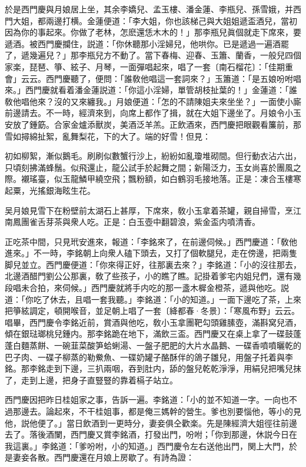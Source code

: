 於是西門慶與月娘居上坐，其余李嬌兒、孟玉樓、潘金蓮、李瓶兒、孫雪娥，并西門大姐，都兩邊打横。金蓮便道：「李大姐，你也該梯己與大姐姐遞盃酒兒，當初因為你的事起來。你做了老林，怎麽還恁木木的！」那李瓶兒眞個就走下席來，要遞酒。被西門慶攔住，説道：「你休聽那小淫婦兒，他哄你。已是遞過一遍酒罷了，遞幾遍兒？」那李瓶兒方不動了。當下春梅、迎春、玉簫、蘭香，一般兒四個家楽，琵琶、箏、絃子、月琴，一面彈唱起來，唱了一套〔南石榴花〕：「佳期重會」云云。西門慶聽了，便問：「誰敎他唱這一套詞來？」玉簫道：「是五娘吩咐唱來。」西門慶就看着潘金蓮説道：「你這小淫婦，單管胡枝扯葉的！」金蓮道：「誰敎他唱他來？沒的又來纏我。」月娘便道：「怎的不請陳姐夫來坐坐？」一面使小廝前邊請去。不一時，經濟來到，向席上都作了揖，就在大姐下邊坐了。月娘令小玉安放了鍾筯。合家金爐添獸炭，美酒泛羊羔。正飲酒來，西門慶把眼觀看簾前，那雪如撏綿扯絮，亂舞梨花，下的大了。端的好雪！但見：

\begin{myquote}
初如柳絮，漸似鵝毛。刷刷似數蟹行沙上，紛紛如亂瓊堆砌間。但行動衣沾六出，只頃刻拂滿蜂鬚。似飛還止，龍公試手於起舞之間；新陽泛力，玉女尚喜於團風之際。襯瑤臺，似玉龍鱗甲繞空飛；飄粉額，如白鶴羽毛接地落。正是：凍合玉樓寒起粟，光搖銀海眩生花。
\end{myquote}

吴月娘見雪下在粉壁前太湖石上甚厚，下席來，敎小玉拿着茶罐，親自掃雪，烹江南鳳團雀舌芽茶與衆人吃。正是：白玉壺中翻碧浪，紫金盃内噴清香。

正吃茶中間，只見玳安進來，報道：「李銘來了，在前邊伺候。」西門慶道：「敎他進來。」不一時，李銘朝上向衆人磕下頭去，又打了個軟腿兒，走在傍邊，把兩隻脚兒並立。西門慶便道：「你來得正好，往那裏去來？」李銘道：「小的沒往那去，北邊酒醋門劉公公那裏，敎了些孩子，小的瞧了瞧。記掛着爹宅内姐兒們，還有幾段唱未合拍，來伺候。」西門慶就將手内吃的那一盞木樨金橙茶，遞與他吃。説道：「你吃了休去，且唱一套我聽。」李銘道：「小的知道。」一面下邊吃了茶，上來把箏絃調定，頓開喉音，並足朝上唱了一套〔絳都春·冬景〕：「寒風布野」云云。　唱畢，西門慶令李銘近前，賞酒與他吃，敎小玉拿團靶勾頭雞膆壺，滿斟窝兒酒，傾在銀琺瑯桃兒鍾内。那李銘跪在地下，滿飲三盃。西門慶又在桌上拿了一碟鼓蓬蓬白麵蒸餅、一碗韮菜酸笋蛤蜊湯、一盤子肥肥的大片水晶鵝、一碟香噴噴曬乾的巴子肉、一碟子柳蒸的勒鮝魚、一碟奶罐子酪酥伴的鴿子雛兒，用盤子托着與李銘。那李銘走到下邊，三扒兩咽，吞到肚内，舔的盤兒乾乾淨淨，用絹兒把嘴兒抹了，走到上邊，把身子直豎豎的靠着槅子站立。

西門慶因把昨日桂姐家之事，告訴一遍。李銘道：「小的並不知道一字。一向也不過那邊去。論起來，不干桂姐事，都是俺三媽幹的營生。爹也別要惱他，等小的見他，説他便了。」當日飲酒到一更時分，妻妾俱仝歡楽。先是陳經濟大姐徑往前邊去了。落後酒闌，西門慶又賞李銘酒，打發出門，吩咐；「你到那邊，休説今日在我這裏。」李銘道：「爹吩咐，小的知道。」西門慶令左右送他出門，関上大門，於是妻妾各散。西門慶還在月娘上房歇了。有詩為證：

